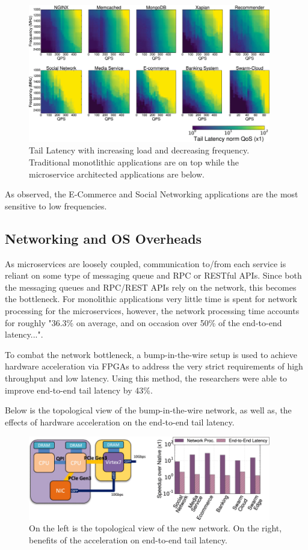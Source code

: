 \documentclass[12pt]{report}
\begin{document}
\begin{figure}[H]
    \centering
    \includegraphics[width=300pt]{images/heat_map_qos.png}
    \caption{Tail Latency with increasing load and decreasing frequency. Traditional monotlithic applications are on top while the microservice architected applications are below.}
    \label{fig:qos_heatmap}
\end{figure}

As observed, the E-Commerce and Social Networking applications are the most sensitive to low frequencies.

\subsection*{Networking and OS Overheads}
As microservices are loosely coupled, communication to/from each service is reliant on some type of messaging queue and RPC or RESTful APIs. Since both the messaging queues and RPC/REST APIs rely on the network, this becomes the bottleneck. For monolithic applications very little time is spent for network processing for the microservices, however, the network processing time accounts for roughly "36.3\% on average, and on occasion over 50\% of the end-to-end latency..."\cite{article}. 

To combat the network bottleneck, a bump-in-the-wire setup is used to achieve hardware acceleration via FPGAs to address the very strict requirements of high throughput and low latency. Using this method, the researchers were able to improve end-to-end tail latency by 43\%.

Below is the topological view of the bump-in-the-wire network, as well as, the effects of hardware acceleration on the end-to-end tail latency.

\begin{figure}[H]
    \centering
    \includegraphics[width=300pt]{images/network.png}
    \caption{On the left is the topological view of the new network. On the right, benefits of the acceleration on end-to-end tail latency.}
    \label{fig:network}
\end{figure}
\end{document}
